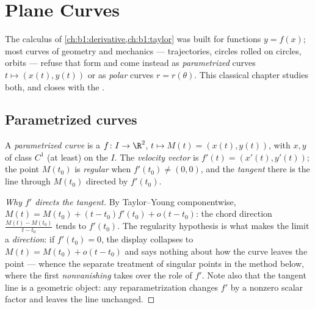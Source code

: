 \chapter{Plane Curves}\label{ch:b1:curves}

The calculus of \cref{ch:b1:derivative,ch:b1:taylor} was built for
functions $y = f(x)$; most curves of geometry and mechanics ---
trajectories, circles rolled on circles, orbits --- refuse that form
and come instead as \emph{parametrized} curves $t \mapsto (x(t),
y(t))$ or as \emph{polar} curves $r = r(\theta)$. This classical
chapter studies both, and closes with the .

\section{Parametrized curves}

\begin{definition}\label{def:b1:curves:def}
A \emph{parametrized curve} is a  $f
\colon I \to \R^2$, $t \mapsto M(t) = (x(t), y(t))$, with $x, y$ of
class $C^1$ (at least) on the  $I$. The \emph{velocity
vector} is $f'(t) = (x'(t), y'(t))$; the point $M(t_0)$ is
\emph{regular} when $f'(t_0) \neq (0,0)$, and the \emph{tangent}
there is the line through $M(t_0)$ directed by $f'(t_0)$.
\end{definition}

\begin{proof}[Why $f'$ directs the tangent]
By Taylor--Young componentwise, $M(t) = M(t_0) + (t - t_0) f'(t_0) +
o(t - t_0)$: the chord direction $\frac{M(t) - M(t_0)}{t - t_0}$
tends to $f'(t_0)$. The regularity hypothesis is what makes the
limit a \emph{direction}: if $f'(t_0) = 0$, the display collapses
to $M(t) = M(t_0) + o(t - t_0)$ and says nothing about how the
curve leaves the point --- whence the separate treatment of
singular points in the method below, where the first
\emph{nonvanishing}  takes over the role of $f'$.
Note also that the tangent line is a geometric object: any
reparametrization changes $f'$ by a nonzero scalar factor and
leaves the line unchanged.
\end{proof}

